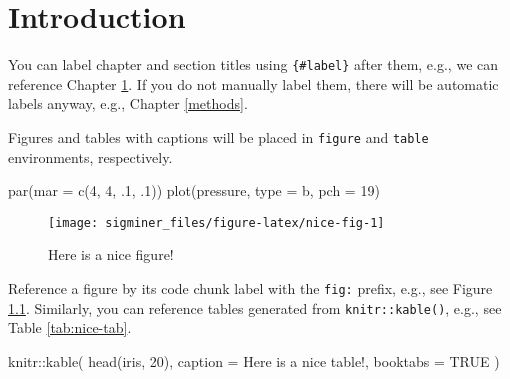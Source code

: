 \documentclass[
  12pt,
  a4paper,
  twoside]{book}
\newenvironment{Shaded}{\begin{snugshade}}{\end{snugshade}}
\newcommand{\AttributeTok}[1]{\textcolor[rgb]{0.77,0.63,0.00}{#1}}
\newcommand{\ConstantTok}[1]{\textcolor[rgb]{0.00,0.00,0.00}{#1}}
\newcommand{\DecValTok}[1]{\textcolor[rgb]{0.00,0.00,0.81}{#1}}
\newcommand{\FunctionTok}[1]{\textcolor[rgb]{0.00,0.00,0.00}{#1}}
\newcommand{\NormalTok}[1]{#1}
\newcommand{\SpecialCharTok}[1]{\textcolor[rgb]{0.00,0.00,0.00}{#1}}
\newcommand{\StringTok}[1]{\textcolor[rgb]{0.31,0.60,0.02}{#1}}
\begin{document}
\hypertarget{intro}{%
\chapter{Introduction}\label{intro}}

You can label chapter and section titles using \texttt{\{\#label\}} after them, e.g., we can reference Chapter \ref{intro}. If you do not manually label them, there will be automatic labels anyway, e.g., Chapter \ref{methods}.

Figures and tables with captions will be placed in \texttt{figure} and \texttt{table} environments, respectively.

\begin{Shaded}
\begin{Highlighting}[]
\FunctionTok{par}\NormalTok{(}\AttributeTok{mar =} \FunctionTok{c}\NormalTok{(}\DecValTok{4}\NormalTok{, }\DecValTok{4}\NormalTok{, .}\DecValTok{1}\NormalTok{, .}\DecValTok{1}\NormalTok{))}
\FunctionTok{plot}\NormalTok{(pressure, }\AttributeTok{type =} \StringTok{\textquotesingle{}b\textquotesingle{}}\NormalTok{, }\AttributeTok{pch =} \DecValTok{19}\NormalTok{)}
\end{Highlighting}
\end{Shaded}

\begin{figure}

{\centering \texttt{[image: sigminer\_files/figure-latex/nice-fig-1]} 

}

\caption{Here is a nice figure!}\label{fig:nice-fig}
\end{figure}

Reference a figure by its code chunk label with the \texttt{fig:} prefix, e.g., see Figure \ref{fig:nice-fig}. Similarly, you can reference tables generated from \texttt{knitr::kable()}, e.g., see Table \ref{tab:nice-tab}.

\begin{Shaded}
\begin{Highlighting}[]
\NormalTok{knitr}\SpecialCharTok{::}\FunctionTok{kable}\NormalTok{(}
  \FunctionTok{head}\NormalTok{(iris, }\DecValTok{20}\NormalTok{), }\AttributeTok{caption =} \StringTok{\textquotesingle{}Here is a nice table!\textquotesingle{}}\NormalTok{,}
  \AttributeTok{booktabs =} \ConstantTok{TRUE}
\NormalTok{)}
\end{Highlighting}
\end{Shaded}
\end{document}
